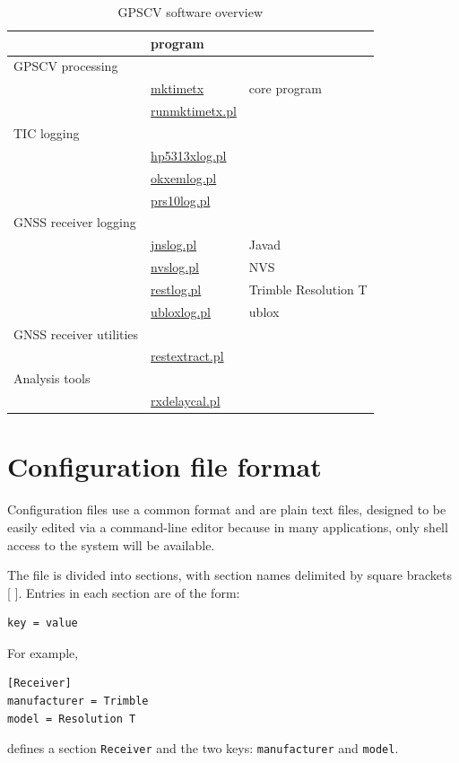 \documentclass[11pt,a4paper,openany,oneside]{book}
\newcommand{\cc}[1]{{\texttt{#1}}}
\begin{document}
\begin{table}[h]
\begin{tabular}{l|l|l}
	& program & \\ 
	\hline
GPSCV processing  &  & \\
	& \hyperlink{h:mktimetx}{mktimetx} & core program\\
	& \hyperlink{h:runmktimetx}{runmktimetx.pl} & \\
	\hline
TIC logging & & \\
	& \hyperlink{h:hp5313xlog}{hp5313xlog.pl} &\\
	& \hyperlink{h:okxemlog}{okxemlog.pl} & \\
	& \hyperlink{h:prs10log}{prs10log.pl} & \\
	\hline
GNSS receiver logging & & \\
	&	\hyperlink{h:jnslog}{jnslog.pl} & Javad\\
	& \hyperlink{h:nvslog}{nvslog.pl} & NVS\\
	& \hyperlink{h:restlog}{restlog.pl} & Trimble Resolution T\\
	& \hyperlink{h:ubloxlog}{ubloxlog.pl} & ublox\\
GNSS receiver utilities & & \\
	& \hyperlink{h:restextract}{restextract.pl} & \\
	\hline
Analysis tools & & \\
	& \hyperlink{h:rxdelaycal}{rxdelaycal.pl} & \\
	\hline
\end{tabular}
\caption{GPSCV software overview}
\end{table}

\section{Configuration file format \label{sConfigFileFormat}}

Configuration files use a common format and are plain text files, designed to be easily edited via a command-line
editor because in many applications, only shell access to the system will be available.

The file is divided into sections, with section names delimited by square brackets [ ]. Entries in each section
are of the form:
\begin{lstlisting}
key = value
\end{lstlisting}
For example,
\begin{lstlisting}
[Receiver]
manufacturer = Trimble
model = Resolution T
\end{lstlisting}
defines a section \cc{Receiver} and the two keys: \cc{manufacturer} and \cc{model}. 
\end{document}
